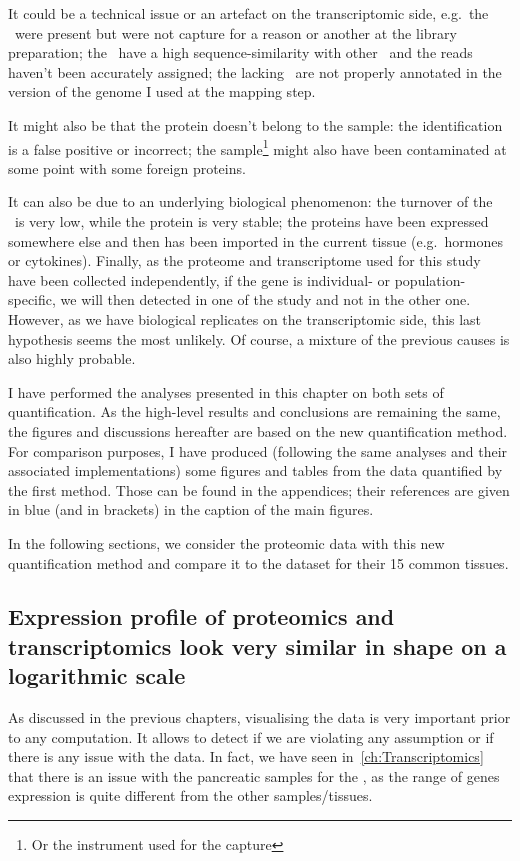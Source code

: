 It could be a technical issue or an artefact on the transcriptomic side, e.g.\
the \mRNAs\ were present but were not capture for a reason or another at the
library preparation; the \mRNAs\ have a high sequence-similarity with other \mRNAs\
and the reads haven't been accurately assigned; the lacking \mRNAs\ are not properly
annotated in the version of the genome I used at the mapping step.

It might also be that the protein doesn't belong to the sample: the identification
is a false positive or incorrect; the sample\footnote{Or the instrument used for
the capture} might also have been contaminated at some point with some foreign
proteins.

It can also be due to an underlying biological phenomenon:
the turnover of the \mRNA\ is very low, while the protein is very stable;
the proteins have been expressed somewhere else and then has been imported in the
current tissue (e.g.\ hormones or cytokines). Finally, as the proteome
and transcriptome used for this study have been collected independently, if the
gene is individual- or population-specific, we will then detected in one of the
study and not in the other one. However, as we have biological replicates on the
transcriptomic side, this last hypothesis seems the most unlikely.
Of course, a mixture of the previous causes is also highly probable.

I have performed the analyses presented in this chapter on both sets of
quantification. As the high-level results and conclusions are remaining the same,
the figures and discussions hereafter are based on
the new quantification method. For comparison purposes,
I have produced (following the same analyses and their associated implementations)
some figures and tables from the data quantified by the first method.
Those can be found in the appendices; their references
are given in blue (and in brackets) in the caption of the main figures.


In the following sections, we consider the proteomic data with this new
quantification method and compare it to the  dataset
for their 15 common tissues.

\subsection{Expression profile of proteomics and transcriptomics look very
similar in shape on a logarithmic scale}
\label{subsec:IntegrationExpProfileSim}

As discussed in the previous chapters, visualising the data is very important
prior to any computation. It allows to detect if we are violating
any assumption or if there is any issue with the data. In fact, we have seen
in~\cref{ch:Transcriptomics} that there is an issue with the pancreatic
samples for the \dataset{Uhlén \etal}, as the range of genes expression is quite
different from the other samples/tissues.


